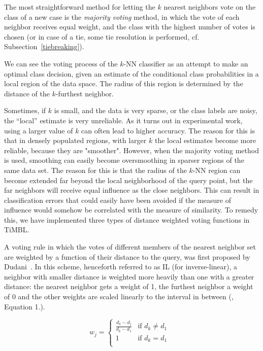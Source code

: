 \documentclass{report}
\begin{document}
The most straightforward method for letting the $k$ nearest neighbors
vote on the class of a new case is the {\em majority voting} method,
in which the vote of each neighbor receives equal weight, and the
class with the highest number of votes is chosen (or in case of a tie,
some tie resolution is performed, cf. Subsection~\ref{tiebreaking}).

We can see the voting process of the $k$-NN classifier as an attempt
to make an optimal class decision, given an estimate of the
conditional class probabilities in a local region of the data space.
The radius of this region is determined by the distance of the
$k$-furthest neighbor.

Sometimes, if $k$ is small, and the data is very sparse, or the class
labels are noisy, the ``local'' estimate is very unreliable.  As it
turns out in experimental work, using a larger value of $k$ can often
lead to higher accuracy. The reason for this is that in densely
populated regions, with larger $k$ the local estimates become more
reliable, because they are "smoother".  However, when the majority
voting method is used, smoothing can easily become oversmoothing in
sparser regions of the same data set. The reason for this is that the
radius of the $k$-NN region can become extended far beyond the local
neighborhood of the query point, but the far neighbors will receive
equal influence as the close neighbors. This can result in
classification errors that could easily have been avoided if the
measure of influence would somehow be correlated with the measure of
similarity. To remedy this, we have implemented three types of distance 
weighted voting functions in TiMBL.

A voting rule in which the votes of different members of the nearest
neighbor set are weighted by a function of their distance to the
query, was first proposed by Dudani~. In this
scheme, henceforth referred to as IL (for inverse-linear), a neighbor
with smaller distance is weighted more heavily than one with a greater
distance: the nearest neighbor gets a weight of 1, the furthest
neighbor a weight of 0 and the other weights are scaled linearly to
the interval in between (, Equation 1.).

\begin{equation}
\label{dudani_eq}
w_{j}= \left \{ \begin{array}{ll}  
                        \frac{d_{k} - d_{j}}{d_{k} - d_{1}} & \mbox{if $d_{k}
\not= d_{1}$ } \\ 
                        1 & \mbox{if $d_{k} = d_{1}$}\\
                    \end{array} 
          \right. 
\end{equation}
\end{document}
